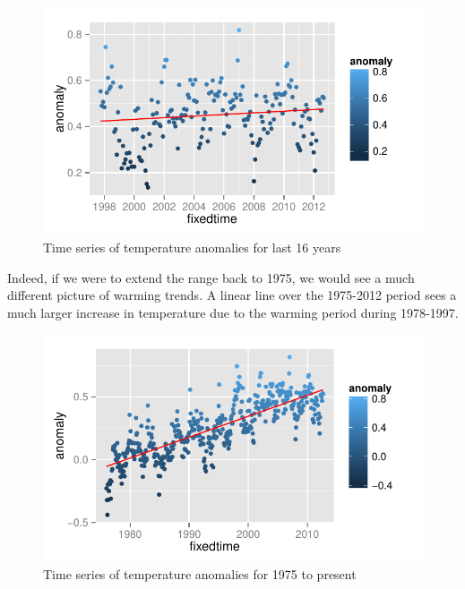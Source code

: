 \documentclass{article}\usepackage{graphicx, color}
\newenvironment{knitrout}{}{} %
\begin{document}
\begin{figure}[H]
\begin{knitrout}
\color{fgcolor}\includegraphics[width=\linewidth]{figure/15-years} 
\end{knitrout}

\caption{\label{last16}Time series of temperature anomalies for last 16 years}
\end{figure}

Indeed, if we were to extend the range back to 1975, we would see a much different picture of warming trends. A linear line over the 1975-2012 period sees a much larger increase in temperature due to the warming period during 1978-1997.

\begin{figure}[H]
\begin{knitrout}
\color{fgcolor}\includegraphics[width=\linewidth]{figure/recent-trend} 
\end{knitrout}

\caption{\label{1975topresent}Time series of temperature anomalies for 1975 to present}
\end{figure}
\end{document}
